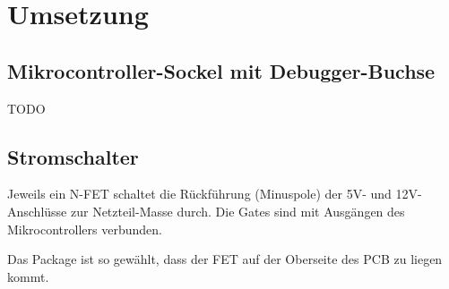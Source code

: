 
\section{Umsetzung}
\subsection{Mikrocontroller-Sockel mit Debugger-Buchse}
TODO

\subsection{Stromschalter}
Jeweils ein N-FET schaltet die R\"uckf\"uhrung (Minuspole)
der 5V- und 12V-Anschl\"usse zur Netzteil-Masse durch.
Die Gates sind mit Ausg\"angen des Mikrocontrollers verbunden.

Das Package ist so gew\"ahlt,
dass der FET auf der Oberseite des PCB
zu liegen kommt.
